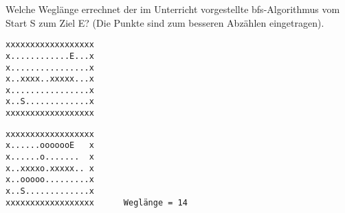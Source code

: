 \question[1]
Welche Weglänge errechnet der im Unterricht vorgestellte bfs-Algorithmus
vom Start S zum Ziel E? (Die Punkte sind zum besseren Abzählen eingetragen).
\begin{lstlisting}
xxxxxxxxxxxxxxxxxx
x............E...x
x................x
x..xxxx..xxxxx...x
x................x
x..S.............x
xxxxxxxxxxxxxxxxxx
\end{lstlisting}
\begin{solutionbox}{4cm}
\begin{lstlisting}
xxxxxxxxxxxxxxxxxx
x......ooooooE   x
x......o.......  x
x..xxxxo.xxxxx.. x
x..ooooo.........x
x..S.............x
xxxxxxxxxxxxxxxxxx      Weglänge = 14
\end{lstlisting}
\end{solutionbox}
